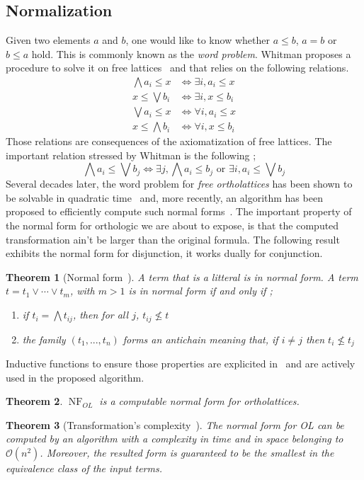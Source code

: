 \documentclass[a4paper, 11pt]{article}
\newtheorem{theorem}{Theorem}
\DeclareMathOperator{\nf}{NF}
\begin{document}
    \subsection{Normalization}
    Given two elements $a$ and $b$, one would like to know whether $a\leq b$, $a=b$ or 
    $b\leq a$ hold. This is commonly known as the \textit{word problem}. Whitman proposes a procedure to
    solve it on free lattices~\cite{43df3167-5a81-387d-88d7-2d29cdf1c881} and that relies on
    the following relations.
    \begin{align}
	    \bigwedge a_i\leq x&\Leftrightarrow\exists i,a_i\leq x\\
	    x\leq\bigvee b_i&\Leftrightarrow\exists i,x\leq b_i\\
	    \bigvee a_i\leq x&\Leftrightarrow\forall i,a_i\leq x\\
	    x\leq\bigwedge b_i&\Leftrightarrow\forall i,x\leq b_i
    \end{align}
    Those relations are consequences of the axiomatization of free lattices. The important relation
    stressed by Whitman is the following ;
    \[
	    \bigwedge a_i\leq\bigvee b_j\Leftrightarrow\exists j,\bigwedge a_i\leq b_j\text{ or }
	    \exists i,a_i\leq\bigvee b_j
    \]
    Several decades later, the word problem for \textit{free ortholattices} has been shown to be 
    solvable in quadratic time~\cite{Bruns_1976} and, more recently, an algorithm has 
    been proposed to efficiently compute such normal forms~\cite{10.1007/978-3-031-37709-9_19}. The
    important property of the normal form for orthologic we are about to expose, is that the
    computed transformation ain't be larger than the original formula. The following result exhibits
    the normal form for disjunction, it works dually for conjunction.
    \begin{theorem}[Normal form~\cite{free_lattices_ams}]
	    A term that is a litteral is in normal form. A term $t=t_1\vee\cdots\vee t_m$, with $m>1$ 
	    is in normal form if and only if ;
    \begin{enumerate}
	    \item
		    if $t_i=\bigwedge t_{ij}$, then for all $j$, $t_{ij}\not\leq t$
	    \item
		    the family $(t_1,...,t_n)$ forms an antichain meaning that, if $i\neq j$ then 
		    $t_i\not\leq t_j$
    \end{enumerate} 
    \end{theorem}
    Inductive functions to ensure those properties are explicited in~\cite{10.1007/978-3-031-37709-9_19}
    and are actively used in the proposed algorithm.
    \begin{theorem}
	    $\nf_{OL}$ is a computable normal form for ortholattices.
    \end{theorem}
    \begin{theorem}[Transformation's complexity~\cite{10.1007/978-3-031-37709-9_19}]
	    The normal form for OL can be computed by an algorithm with a complexity in time and in space
	    belonging to $\mathcal{O}(n^2)$. Moreover, the resulted form
	    is guaranteed to be the smallest in the equivalence class of the input terms.
    \end{theorem}
\end{document}
